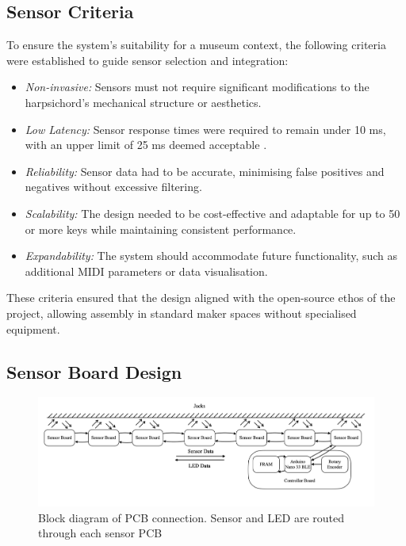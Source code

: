\subsection{Sensor Criteria}\label{sensor-criteria}

To ensure the system's suitability for a museum context, the following criteria were established to guide sensor selection and integration:

\begin{itemize}
    \item \emph{Non-invasive:} Sensors must not require significant modifications to the harpsichord's mechanical structure or aesthetics.
    \item \emph{Low Latency:} Sensor response times were required to remain under 10 ms, with an upper limit of 25 ms deemed acceptable \cite{Jack2016}.
    \item \emph{Reliability:} Sensor data had to be accurate, minimising false positives and negatives without excessive filtering.
    \item \emph{Scalability:} The design needed to be cost-effective and adaptable for up to 50 or more keys while maintaining consistent performance.
    \item \emph{Expandability:} The system should accommodate future functionality, such as additional MIDI parameters or data visualisation.
\end{itemize}

These criteria ensured that the design aligned with the open-source ethos of the project, allowing assembly in standard maker spaces without specialised equipment. 

\subsection{Sensor Board Design}\label{sensor-board}

\begin{figure}
    \centering
    \includegraphics[width=\linewidth]{src/images/system-block-diagram-long.png}
    \caption{Block diagram of PCB connection. Sensor and LED are routed through each sensor PCB}
    \label{fig:system-block-diagram}
\end{figure}

